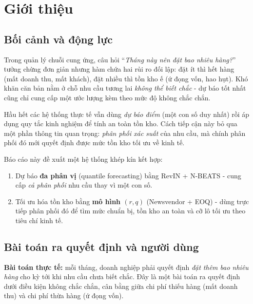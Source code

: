 \documentclass[12pt, a4paper]{report}
\begin{document}
\tableofcontents
\listoffigures
\listoftables

\chapter{Giới thiệu}

\section{Bối cảnh và động lực}

Trong quản lý chuỗi cung ứng, câu hỏi ``\textit{Tháng này nên đặt bao nhiêu hàng?}'' tưởng chừng đơn giản nhưng hàm chứa hai rủi ro đối lập: đặt ít thì hết hàng (mất doanh thu, mất khách), đặt nhiều thì tồn kho ế (ứ đọng vốn, hao hụt). Khó khăn căn bản nằm ở chỗ nhu cầu tương lai \textit{không thể biết chắc} - dự báo tốt nhất cũng chỉ cung cấp một ước lượng kèm theo mức độ không chắc chắn.

Hầu hết các hệ thống thực tế vẫn dùng \textit{dự báo điểm} (một con số duy nhất) rồi áp dụng quy tắc kinh nghiệm để tính an toàn tồn kho. Cách tiếp cận này bỏ qua một phần thông tin quan trọng: \textit{phân phối xác suất} của nhu cầu, mà chính phân phối đó mới quyết định được mức tồn kho tối ưu về kinh tế.

Báo cáo này đề xuất một hệ thống khép kín kết hợp:
\begin{enumerate}
  \item Dự báo \textbf{đa phân vị} (quantile forecasting) bằng RevIN + N-BEATS - cung cấp \textit{cả phân phối} nhu cầu thay vì một con số.
  \item Tối ưu hóa tồn kho bằng \textbf{mô hình $(r,q)$} (Newsvendor + EOQ) - dùng trực tiếp phân phối đó để tìm mức chuẩn bị, tồn kho an toàn và cỡ lô tối ưu theo tiêu chí kinh tế.
\end{enumerate}

\section{Bài toán ra quyết định và người dùng}
\label{sec:decision_problem}

\textbf{Bài toán thực tế:} mỗi tháng, doanh nghiệp phải quyết định \textit{đặt thêm bao nhiêu hàng} cho kỳ tới khi nhu cầu chưa biết chắc. Đây là một bài toán ra quyết định dưới điều kiện không chắc chắn, cân bằng giữa chi phí thiếu hàng (mất doanh thu) và chi phí thừa hàng (ứ đọng vốn).
\end{document}
